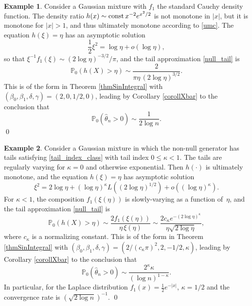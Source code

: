 \documentclass[11pt]{article}
\theoremstyle{definition}
\newtheorem{example}{Example}[section]
\newcommand{\PP}{\mathbb{P}}
\def\Prob{{\mathbb P}}
\def\vhalf{\textstyle{\frac 1 2}}
\begin{document}
\begin{example}\label{exampleGaussCauchy2}
	Consider a Gaussian mixture with $f_1$ the standard Cauchy density function. The density ratio $h(x) \sim \hbox{\rm const}\,x^{-2} e^{x^2/2}$ is not monotone in $|x|$, but it is monotone for $|x| > 1$, and thus ultimately monotone according to \eqref{umc}. The equation 
	$h(\xi) = \eta$ has an asymptotic solution
    \begin{equation}\label{eqAsympSol}
	\vhalf \xi^2 = \log\eta + o(\log \eta),
	\end{equation}
	so that $\xi^{-1}f_1(\xi) \sim (2\log \eta)^{-3/2}/\pi$, and the tail approximation \eqref{null_tail} is
	\[
	\Prob_0(h(X) > \eta) \sim \frac{2} {\pi \eta\, (2\log\eta)^{3/2}}.
	\]
	This is of the form in Theorem \ref{thmSinIntegral} with $(\beta_0, \beta_1, \delta, \gamma)=(2, 0, 1/2,0)$, leading by Corollary \ref{corollXbar} to the conclusion that 
    \begin{equation}\label{eqApproxGaussCauchy}
	\PP_0(\hat\theta_n>0)\sim \frac{1}{2\log n}. 
	\end{equation}
	\qed
\end{example}



\begin{example}\label{exampleTailIndex}
	Consider a Gaussian mixture in which the non-null generator has  tails satisfying \eqref{tail_index_class} with tail index $0\leq \kappa<1$. The tails are regularly varying for $\kappa=0$ and otherwise exponential. 
    Then $h(\cdot)$ is ultimately monotone, and the equation $h(\xi) = \eta$ has asymptotic solution
	\[
	\xi^2 = 2\log\eta + (\log\eta)^{\kappa} L((2\log\eta)^{1/2}) + o((\log\eta)^{\kappa}).
	\]
	For $\kappa < 1$, the composition $f_1(\xi(\eta))$ is slowly-varying as a function of~$\eta$, and the tail approximation \eqref{null_tail} is
	\[
	\Prob_0(h(X) > \eta)\sim \frac {2 f_1(\xi(\eta))} {\eta\, \xi(\eta)} \sim \frac{2 c_\kappa e^{-(2\log \eta)^\kappa}}{\eta \sqrt{2\log \eta}},
	\]
	where $c_\kappa$ is a normalizing constant. This is of the form in Theorem \ref{thmSinIntegral} with $(\beta_0, \beta_1, \delta, \gamma)=(2/(c_\kappa \pi)^2, 2, -1/2, \kappa)$, leading by Corollary \ref{corollXbar} to the conclusion that 
	\[
	\PP_0(\hat\theta_n>0)\sim \frac{2^\kappa \kappa}{(\log n)^{1-\kappa}}.
	\]
	In particular, for the Laplace distribution $f_1(x)= \frac{1}{2}e^{-|x|}$, $\kappa=1/2$ and the convergence rate is $(\sqrt{2\log n})^{-1}$. \qed
\end{example}
\end{document}
